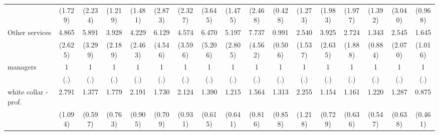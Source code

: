 {\begin{tabular}{l*{16}{c}}
                    &     (1.729)         &     (2.234)         &     (1.219)         &     (1.481)         &     (2.873)         &     (2.327)         &     (3.645)         &     (1.475)         &     (2.468)         &     (0.428)         &     (1.273)         &     (1.983)         &     (1.977)         &     (1.392)         &     (3.040)         &     (0.968)         \\
[1em]
Other services      &       4.865\sym{**} &       5.891\sym{**} &       3.928\sym{*}  &       4.229\sym{*}  &       6.129\sym{*}  &       4.574         &       6.470\sym{*}  &       5.197\sym{**} &       7.737\sym{***}&       0.991         &       2.540         &       3.925\sym{*}  &       2.724         &       1.343         &       2.545         &       1.645         \\
                    &     (2.625)         &     (3.299)         &     (2.189)         &     (2.463)         &     (4.546)         &     (3.596)         &     (5.206)         &     (2.805)         &     (4.562)         &     (0.506)         &     (1.537)         &     (2.635)         &     (1.888)         &     (0.884)         &     (2.070)         &     (1.016)         \\
[1em]
managers            &           1         &           1         &           1         &           1         &           1         &           1         &           1         &           1         &           1         &           1         &           1         &           1         &           1         &           1         &           1         &           1         \\
                    &         (.)         &         (.)         &         (.)         &         (.)         &         (.)         &         (.)         &         (.)         &         (.)         &         (.)         &         (.)         &         (.)         &         (.)         &         (.)         &         (.)         &         (.)         &         (.)         \\
[1em]
white collar - prof.&       2.791\sym{**} &       1.377         &       1.779         &       2.191         &       1.730         &       2.124         &       1.390         &       1.215         &       1.564         &       1.313         &       2.255         &       1.154         &       1.161         &       1.220         &       1.287         &       0.875         \\
                    &     (1.094)         &     (0.597)         &     (0.763)         &     (0.905)         &     (0.709)         &     (0.931)         &     (0.615)         &     (0.641)         &     (0.816)         &     (0.858)         &     (1.218)         &     (0.729)         &     (0.636)         &     (0.547)         &     (0.638)         &     (0.461)         \\

\end{tabular}}
